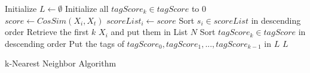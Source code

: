 \IncMargin{1em}
\begin{algorithm}
\label{alg:knn}
\BlankLine
Initialize $L \leftarrow \emptyset$ \;
Initialize all $tagScore_k \in tagScore$ to 0 \;
 {
	$score \leftarrow CosSim(X_i, X_t)$ \;
	$scoreList_i \leftarrow score$ \;
}
Sort $s_i \in scoreList$ in descending order \; 
Retrieve the first $k$ $X_i$ and put them in List $N$ \;
Sort $tagScore_k \in tagScore$ in descending order \;
Put the tags of $tagScore_0, tagScore_1, ..., tagScore_{k-1}$ in $L$ \;
\Return $L$\;
\caption{k-Nearest Neighbor Algorithm}\label{algo_disjdecomp}
\end{algorithm}
\DecMargin{1em}

